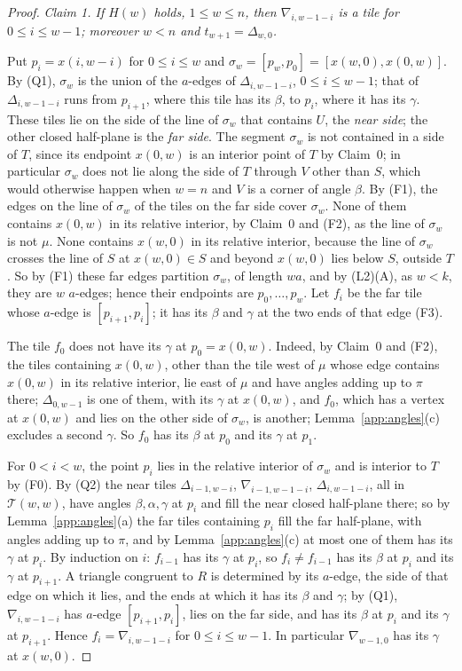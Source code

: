 \documentclass[11pt]{amsart}
\theoremstyle{remark}
\begin{document}
\begin{proof}
\emph{Claim 1. If $H(w)$ holds, $1\le w\le n$, then $\nabla_{i,w-1-i}$ is a tile for $0\le i\le w-1$; moreover $w<n$ and $t_{w+1}=\Delta_{w,0}$.}

Put $p_i=x(i,w-i)$ for $0\le i\le w$ and $\sigma_w=[p_w,p_0]=[x(w,0),x(0,w)]$. By (Q1), $\sigma_w$ is the union of the $a$-edges of $\Delta_{i,w-1-i}$, $0\le i\le w-1$; that of $\Delta_{i,w-1-i}$ runs from $p_{i+1}$, where this tile has its $\beta$, to $p_i$, where it has its $\gamma$. These tiles lie on the side of the line of $\sigma_w$ that contains $U$, the \emph{near side}; the other closed half-plane is the \emph{far side}. The segment $\sigma_w$ is not contained in a side of $T$, since its endpoint $x(0,w)$ is an interior point of $T$ by Claim~0; in particular $\sigma_w$ does not lie along the side of $T$ through $V$ other than $S$, which would otherwise happen when $w=n$ and $V$ is a corner of angle $\beta$. By (F1), the edges on the line of $\sigma_w$ of the tiles on the far side cover $\sigma_w$. None of them contains $x(0,w)$ in its relative interior, by Claim~0 and (F2), as the line of $\sigma_w$ is not $\mu$. None contains $x(w,0)$ in its relative interior, because the line of $\sigma_w$ crosses the line of $S$ at $x(w,0)\in S$ and beyond $x(w,0)$ lies below $S$, outside $T$. So by (F1) these far edges partition $\sigma_w$, of length $wa$, and by (L2)(A), as $w<k$, they are $w$ $a$-edges; hence their endpoints are $p_0,\dots,p_w$. Let $f_i$ be the far tile whose $a$-edge is $[p_{i+1},p_i]$; it has its $\beta$ and $\gamma$ at the two ends of that edge (F3).

The tile $f_0$ does not have its $\gamma$ at $p_0=x(0,w)$. Indeed, by Claim~0 and (F2), the tiles containing $x(0,w)$, other than the tile west of $\mu$ whose edge contains $x(0,w)$ in its relative interior, lie east of $\mu$ and have angles adding up to $\pi$ there; $\Delta_{0,w-1}$ is one of them, with its $\gamma$ at $x(0,w)$, and $f_0$, which has a vertex at $x(0,w)$ and lies on the other side of $\sigma_w$, is another; Lemma~\ref{app:angles}(c) excludes a second $\gamma$. So $f_0$ has its $\beta$ at $p_0$ and its $\gamma$ at $p_1$.

For $0<i<w$, the point $p_i$ lies in the relative interior of $\sigma_w$ and is interior to $T$ by (F0). By (Q2) the near tiles $\Delta_{i-1,w-i}$, $\nabla_{i-1,w-1-i}$, $\Delta_{i,w-1-i}$, all in $\mathcal{T}(w,w)$, have angles $\beta,\alpha,\gamma$ at $p_i$ and fill the near closed half-plane there; so by Lemma~\ref{app:angles}(a) the far tiles containing $p_i$ fill the far half-plane, with angles adding up to $\pi$, and by Lemma~\ref{app:angles}(c) at most one of them has its $\gamma$ at $p_i$. By induction on $i$: $f_{i-1}$ has its $\gamma$ at $p_i$, so $f_i\neq f_{i-1}$ has its $\beta$ at $p_i$ and its $\gamma$ at $p_{i+1}$. A triangle congruent to $R$ is determined by its $a$-edge, the side of that edge on which it lies, and the ends at which it has its $\beta$ and $\gamma$; by (Q1), $\nabla_{i,w-1-i}$ has $a$-edge $[p_{i+1},p_i]$, lies on the far side, and has its $\beta$ at $p_i$ and its $\gamma$ at $p_{i+1}$. Hence $f_i=\nabla_{i,w-1-i}$ for $0\le i\le w-1$. In particular $\nabla_{w-1,0}$ has its $\gamma$ at $x(w,0)$.


\end{proof}
\end{document}
